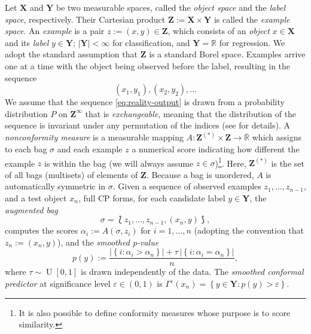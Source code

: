 \documentclass[twoside]{article}
\numberwithin{equation}{section}
\theoremstyle{plain}
\theoremstyle{definition}
\theoremstyle{remark}
\DeclareMathOperator{\UnifDist}{U}
\newcommand{\set}[1]{\left\{#1\right\}}
\newcommand{\abs}[1]{\left\lvert #1 \right\rvert}
\begin{document}
    Let $\mathbf{X}$ and $\mathbf{Y}$ be two measurable spaces, called the \emph{object space} and the \emph{label space}, respectively. Their Cartesian product $\mathbf{Z}:=\mathbf{X}\times\mathbf{Y}$ is called the \emph{example space}. An \emph{example} is a pair $z:=(x,y)\in\mathbf{Z}$, which consists of an \emph{object} $x\in\mathbf{X}$ and its \emph{label} $y\in\mathbf{Y}$; $|\mathbf{Y}|<\infty$ for classification, and $\mathbf{Y}=\mathbb{R}$ for regression. We adopt the standard assumption that $\mathbf{Z}$ is a standard Borel space. Examples arrive one at a time with the object being observed before the label, resulting in the sequence
    \begin{equation}\label{eq:reality-output}
        (x_1,y_1), (x_2,y_2),\dots
    \end{equation}
    We assume that the sequence \eqref{eq:reality-output} is drawn from a probability distribution $P$ on $\mathbf{Z}^{\infty}$ that is \emph{exchangeable}, meaning that the distribution of the sequence is invariant under any permutation of the indices (see \citet[A.5]{alrw2} for details). 
    A \emph{nonconformity measure} is a measurable mapping $A:\mathbf{Z}^{(*)}\times\mathbf{Z}\to\overline{\mathbb{R}}$ which assigns to each bag $\sigma$ and each example $z$ a numerical score indicating how different the example $z$ is within the bag (we will always assume $z\in\sigma$)\footnote{It is also possible to define conformity measures whose purpose is to score similarity.}. Here, $\mathbf{Z}^{(*)}$ is the set of all bags (multisets) of elements of $\mathbf{Z}$. Because a bag is unordered, $A$ is automatically symmetric in $\sigma$. 
    Given a sequence of observed examples $z_1,\dots,z_{n-1}$, and a test object $x_n$, full CP forms, for each candidate label $y\in\mathbf{Y}$, the \emph{augmented bag}
    \begin{equation}
        \sigma = \lbag z_1,\dots,z_{n-1},(x_n,y)\rbag,
    \end{equation}
    computes the scores $\alpha_i := A(\sigma,z_i)$ for $i=1,\dots,n$ (adopting the convention that $z_n := (x_n,y)$), and the \emph{smoothed p-value}
    \begin{equation}\label{eq:pvalue}
        p(y) := \frac{\abs{\set{i : \alpha_i > \alpha_n}} + \tau\,\abs{\set{i : \alpha_i = \alpha_n}}}{n},
    \end{equation}
    where $\tau \sim \UnifDist[0,1]$ is drawn independently of the data. The \emph{smoothed conformal predictor} at significance level $\varepsilon \in (0,1)$ is $\Gamma^{\varepsilon}(x_n) = \set{y \in \mathbf{Y} : p(y) > \varepsilon}$.
\end{document}
